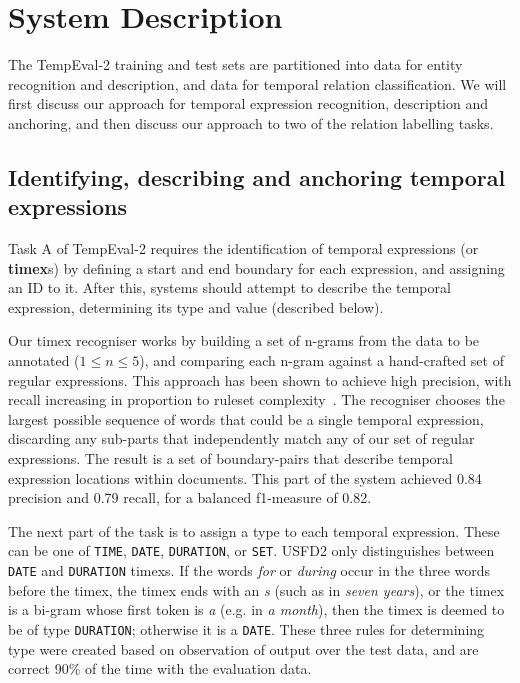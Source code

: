 \documentclass[11pt]{article}
\begin{document}
\section{System Description}
\label{description}
The TempEval-2 training and test sets are partitioned into data for entity recognition and description, and data for temporal relation classification. We will first discuss our approach for temporal expression recognition, description and anchoring, and then discuss our approach to two of the relation labelling tasks.

\subsection{Identifying, describing and anchoring temporal expressions}
\label{timex}
Task A of TempEval-2 requires the identification of temporal expressions (or {\bf timex}s) by defining a start and end boundary for each expression, and assigning an ID to it. After this, systems should attempt to describe the temporal expression, determining its type and value (described below).

Our timex recogniser works by building a set of n-grams from the data to be annotated ($1 \leq n \leq 5$), and comparing each n-gram against a hand-crafted set of regular expressions. This approach has been shown to achieve high precision, with recall increasing in proportion to ruleset complexity~\cite{han2006language,mani2000robust,ahn2005towards}. The recogniser chooses the largest possible sequence of words that could be a single temporal expression, discarding any sub-parts that independently match any of our set of regular expressions. The result is a set of boundary-pairs that describe temporal expression locations within documents. This part of the system achieved 0.84 precision and 0.79 recall, for a balanced f1-measure of 0.82.

The next part of the task is to assign a type to each temporal expression. These can be one of {\tt TIME}, {\tt DATE}, {\tt DURATION}, or {\tt SET}. USFD2 only distinguishes between {\tt DATE} and {\tt DURATION} timexs. If the words \emph{for} or \emph{during} occur in the three words before the timex, the timex ends with an {\emph s} (such as in \emph{seven years}), or the timex is a bi-gram whose first token is {\emph a} (e.g. in \emph{a month}), then the timex is deemed to be of type {\tt DURATION}; otherwise it is a {\tt DATE}. These three rules for determining type were created based on observation of output over the test data, and are correct 90\% of the time with the evaluation data.
\end{document}
